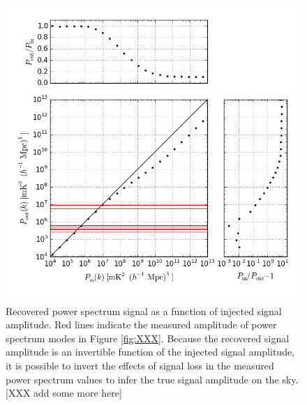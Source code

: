 \documentclass[twocolumn,numberedappendix]{emulateapj} \shorttitle{PSA64}
\begin{document}
\begin{figure}[!t]
\centering
\includegraphics[width=\columnwidth]{plots/sigloss.png}
\caption{
Recovered power spectrum signal as a function of injected signal amplitude.  Red lines
indicate the measured amplitude of power spectrum modes in Figure \ref{fig:XXX}.  Because
the recovered signal amplitude is an invertible function of the injected signal amplitude,
it is possible to invert the effects of signal loss in the measured power spectrum values
to infer the true signal amplitude on the sky. [XXX add some more here]
}\label{fig:signal_loss}
\end{figure}
\end{document}
